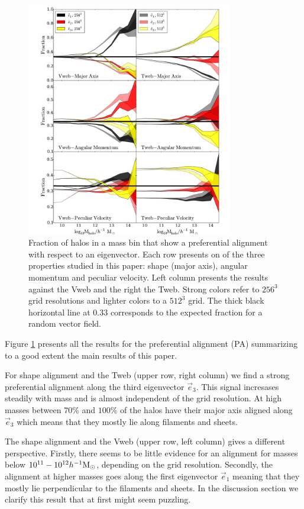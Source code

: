 \documentclass[useAMS,usenatbib]{mn2e}
\newcommand{\hMsun}{{\ifmmode{h^{-1}{\rm
        {M_{\odot}}}}\else{$h^{-1}{\rm{M_{\odot}}}$~}\fi}}
\begin{document}
\begin{figure}
\includegraphics[width=0.8\textwidth]{Fig0.pdf}
\caption{Fraction of halos in a mass bin that show a preferential
  alignment with respect to an eigenvector. Each row presents on of
  the three properties studied in this paper: shape (major axis),
  angular momentum and  peculiar velocity. Left column presents the
  results against the Vweb   and the right the Tweb. Strong colors
  refer to $256^3$ grid resolutions and lighter colors to a $512^3$
  grid. The thick black horizontal line at $0.33$ corresponds to the
  expected fraction for a random vector field.
\label{fig:preferential}}
\end{figure}

Figure \ref{fig:preferential} presents all the results for the
preferential alignment (PA) summarizing to a good extent the main
results of this paper. 

For shape alignment and the Tweb (upper row, right column) we find a strong
preferential alignment along the third eigenvector $\vec{e}_{3}$. This
signal incresases steadily with mass and is almost independent of the
grid resolution. At high masses between $70\%$ and $100\%$ of the
halos have their major axis aligned along $\vec{e}_{3}$ which means
that they mostly lie along filaments and sheets. 

The shape alignment and the Vweb (upper row, left column) gives a
different perspective. Firstly, there seems to be little evidence
for an alignment for masses below $10^{11}-10^{12}\hMsun$, depending
on the grid resolution. Secondly, the alignment at higher masses goes
along the first eigenvector $\vec{e}_{1}$ meaning that they mostly lie
perpendicular to the filaments and sheets. In the discussion section
we clarify this result that at first might seem puzzling.
\end{document}
